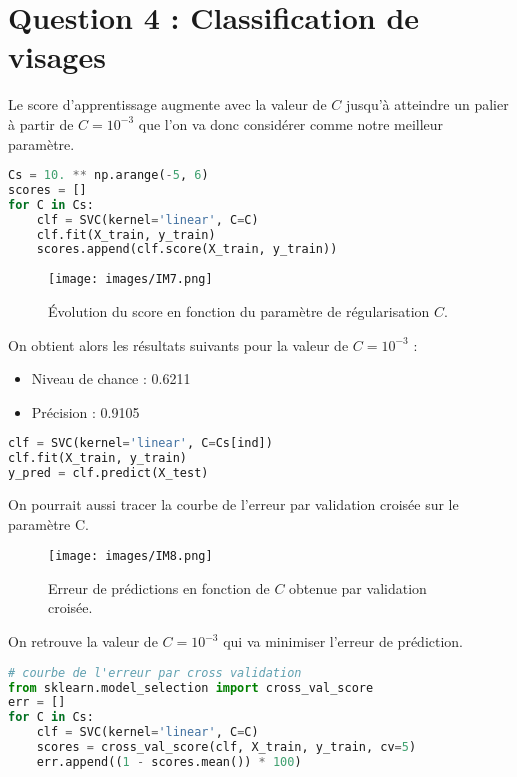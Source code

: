 \documentclass[10pt,a4paper]{article}
\begin{document}
\medskip
\section*{Question 4 : Classification de visages}

Le score d'apprentissage augmente avec la valeur de $C$ jusqu'à atteindre un palier à partir de $C = 10^{-3}$ que l'on va donc considérer comme notre meilleur paramètre.

\begin{lstlisting}[language=Python, caption=Fit d'un classifieur linéaire et test sur différentes valeurs de C]
Cs = 10. ** np.arange(-5, 6)
scores = []
for C in Cs:
    clf = SVC(kernel='linear', C=C)
    clf.fit(X_train, y_train)
    scores.append(clf.score(X_train, y_train))
\end{lstlisting}

\begin{figure}[h!]
    \centering
    \texttt{[image: images/IM7.png]}
    \caption{Évolution du score en fonction du paramètre de régularisation $C$.}
\end{figure}

On obtient alors les résultats suivants pour la valeur de $C = 10^{-3}$ :
\begin{itemize}
    \item Niveau de chance : 0.6211
    \item Précision : 0.9105
\end{itemize}




\begin{lstlisting}[language=Python, caption=Prédiction des étiquettes pour les images de test]
clf = SVC(kernel='linear', C=Cs[ind])
clf.fit(X_train, y_train)
y_pred = clf.predict(X_test)
\end{lstlisting}

 On pourrait aussi tracer la courbe de l'erreur par validation croisée sur le paramètre C.
 
\begin{figure}[h!]
    \centering
    \texttt{[image: images/IM8.png]}
    \caption{Erreur de prédictions en fonction de $C$ obtenue par validation croisée.}
\end{figure}


\newpage  %
\noindent On retrouve  la valeur de $C = 10^{-3}$ qui va minimiser l'erreur de prédiction.


\begin{lstlisting}[language=Python, caption=Courbe de l'erreur par validation croisée]
# courbe de l'erreur par cross validation
from sklearn.model_selection import cross_val_score
err = []
for C in Cs:
    clf = SVC(kernel='linear', C=C)
    scores = cross_val_score(clf, X_train, y_train, cv=5)
    err.append((1 - scores.mean()) * 100)
\end{lstlisting}
\end{document}
